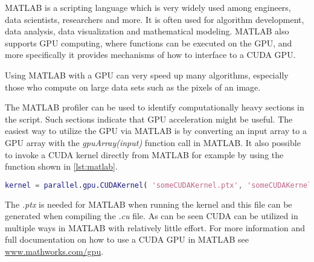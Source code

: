 MATLAB is a scripting language which is very widely used among engineers, data scientists, researchers and more.
It is often used for algorithm development, data analysis, data visualization and mathematical modeling.
MATLAB also supports GPU computing, where functions can be executed on the GPU, and more specifically it provides mechanisms of how to interface to a CUDA GPU.

Using MATLAB with a GPU can very speed up many algorithms, especially those who compute on large data sets such as the pixels of an image.

The MATLAB profiler can be used to identify computationally heavy sections in the script. 
Such sections indicate that GPU acceleration might be useful.
The easiest way to utilize the GPU via MATLAB is by converting an input array to a GPU array with the \textit{gpuArray(input)} function call in MATLAB.
It also possible to invoke a CUDA kernel directly from MATLAB for example by using the function shown in \autoref{lst:matlab}.
\begin{lstlisting}[language=matlab,caption={Invoking CUDA kernel in MATLAB},label=lst:matlab]
	kernel = parallel.gpu.CUDAKernel( 'someCUDAKernel.ptx', 'someCUDAKernel.cu' );
\end{lstlisting}
The \textit{.ptx} is needed for MATLAB when running the kernel and this file can be generated when compiling the \textit{.cu} file.
As can be seen CUDA can be utilized in multiple ways in MATLAB with relatively little effort.
For more information and full documentation on how to use a CUDA GPU in MATLAB see \url{www.mathworks.com/gpu}.